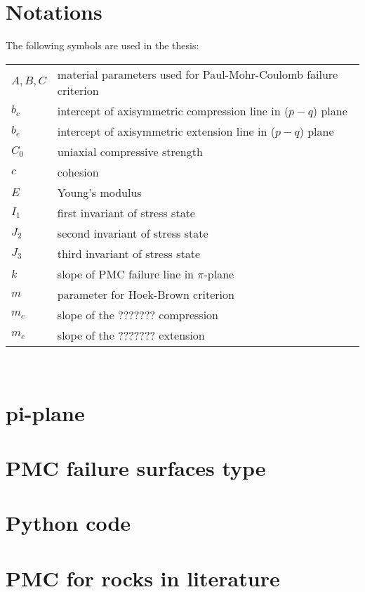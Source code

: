 \appendix
\chapter{Notations}\label{App:A}
The following symbols are used in the thesis:
\begin{table}
    \begin{tabular}{lp{\textwidth}}
        $A, B, C$ & material parameters used for Paul-Mohr-Coulomb failure criterion \\
        $b_c$ & intercept of axisymmetric compression line in ($p-q$) plane \\
        $b_e$ & intercept of axisymmetric extension line in ($p-q$) plane \\
        $C_0$ & uniaxial compressive strength \\
        $c$ & cohesion \\
        $E$ & Young's modulus \\
        $I_1$ & first invariant of stress state \\
        $J_2$ & second invariant of stress state \\
        $J_3$ & third invariant of stress state \\
        $k$ & slope of PMC failure line in $\pi$-plane \\
        $m$ & parameter for Hoek-Brown criterion \\
        $m_c$ & slope of the ??????? compression \\
        $m_e$ & slope of the ??????? extension \\
        
    \end{tabular}\\
\end{table}
\chapter{pi-plane}
\chapter{PMC failure surfaces type}
\chapter{Python code}
\chapter{PMC for rocks in literature}